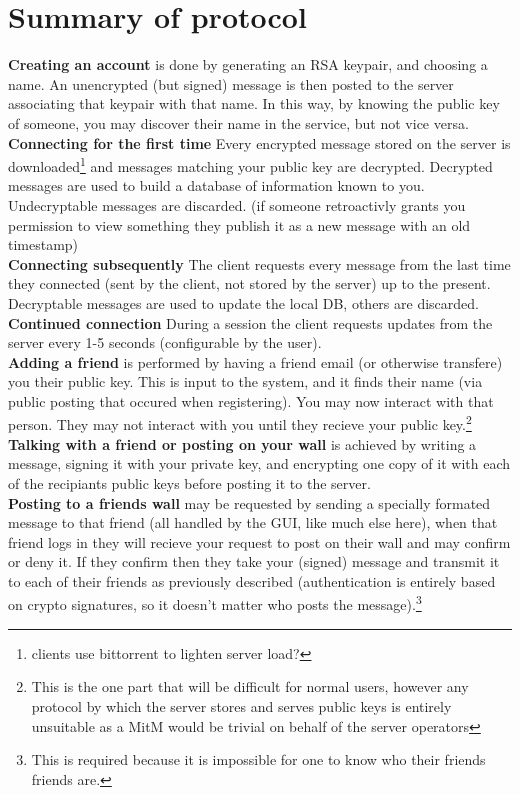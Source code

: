 \section{Summary of protocol} 
\textbf{Creating an account} is done by generating an RSA keypair, and choosing
a name. An unencrypted (but signed) message is then posted to the server
associating that keypair with that name. In this way, by knowing the public key
of someone, you may discover their name in the service, but not vice versa.\\
\textbf{Connecting for the first time} Every encrypted message stored on the
server is downloaded\footnote{clients use bittorrent to lighten server load?}
and messages matching your public key are decrypted. Decrypted messages are used
to build a database of information known to you. Undecryptable messages are
discarded. (if someone retroactivly grants you permission to view something
they publish it as a new message with an old timestamp)\\
\textbf{Connecting subsequently} The client requests every message from the last
time they connected (sent by the client, not stored by the server) up to the
present. Decryptable messages are used to update the local DB, others are
discarded.\\
\textbf{Continued connection} During a session the client requests updates from
the server every 1-5 seconds (configurable by the user).\\
\textbf{Adding a friend} is performed by having a friend email (or otherwise
transfere) you their public key. This is input to the system, and it finds their
name (via public posting that occured when registering). You may now interact
with that person. They may not interact with you until they recieve your public
key.\footnote{This is the one part that will be difficult for normal users,
however any protocol by which the server stores and serves public keys is
entirely unsuitable as a MitM would be trivial on behalf of the server
operators}\\
\textbf{Talking with a friend or posting on your wall} is achieved by writing
a message, signing it with your private key, and encrypting one copy of it with
each of the recipiants public keys before posting it to the server.\\
\textbf{Posting to a friends wall} may be requested by sending a specially
formated message to that friend (all handled by the GUI, like much else here),
when that friend logs in they will recieve your request to post on their wall
and may confirm or deny it. If they confirm then they take your (signed) message
and transmit it to each of their friends as previously described (authentication
is entirely based on crypto signatures, so it doesn't matter who posts the
message).\footnote{This is required because it is impossible for one to know who
their friends friends are.}

